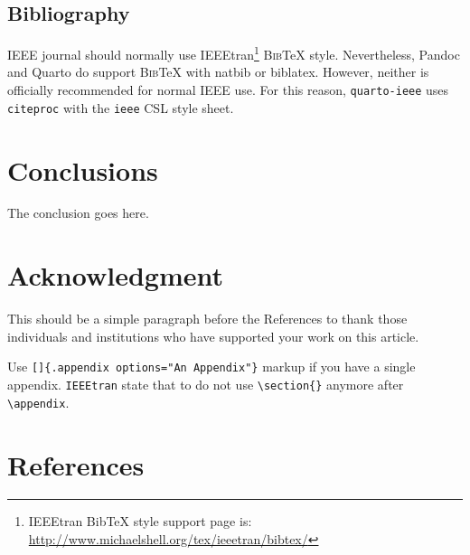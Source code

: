 \documentclass[
  journal,
]{IEEEtran}%
\theoremstyle{plain}
\theoremstyle{remark}
\begin{document}
\subsection{Bibliography}\label{bibliography}

IEEE journal should normally use IEEEtran\footnote{IEEEtran BibTeX style
  support page is:
  \url{http://www.michaelshell.org/tex/ieeetran/bibtex/}}
\textsc{Bib}{\TeX} style. Nevertheless, Pandoc and Quarto do support
\textsc{Bib}{\TeX} with natbib or biblatex. However, neither is
officially recommended for normal IEEE use. For this reason,
\texttt{quarto-ieee} uses \texttt{citeproc} with the \texttt{ieee} CSL
style sheet.

\section{Conclusions}\label{conclusions}

The conclusion goes here.

\section*{Acknowledgment}\label{acknowledgment}

This should be a simple paragraph before the References to thank those
individuals and institutions who have supported your work on this
article.

\appendix[An Appendix]{}

Use \texttt{{[}{]}\{.appendix\ options="An\ Appendix"\}} markup if you
have a single appendix. \texttt{IEEEtran} state that to do not use
\texttt{\textbackslash{}section\{\}} anymore after
\texttt{\textbackslash{}appendix}.

\section*{References}\label{references}
\end{document}
